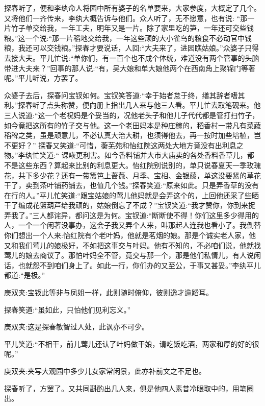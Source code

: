 \begin{parag}
    探春听了，便和李纨命人将园中所有婆子的名单要来，大家参度，大概定了几个。又将他们一齐传来，李纨大概告诉与他们。众人听了，无不愿意，也有说: “那一片竹子单交给我，一年工夫，明年又是一片。除了家里吃的笋，一年还可交些钱粮。”这一个说:“那一片稻地交给我，一年这些顽的大小雀鸟的粮食不必动官中钱粮，我还可以交钱粮。”探春才要说话，人回:“大夫来了，进园瞧姑娘。”众婆子只得去接大夫。平儿忙说:“单你们，有一百个也不成个体统，难道没有两个管事的头脑带进大夫来？”回事的那人说:“有，吴大娘和单大娘他两个在西南角上聚锦门等著呢。”平儿听说，方罢了。
\end{parag}


\begin{parag}
    众婆子去后，探春问宝钗如何。宝钗笑答道:“幸于始者怠于终，缮其辞者嗜其利。”探春听了点头称赞，便向册上指出几人来与他三人看。平儿忙去取笔砚来。他三人说道:“这一个老祝妈是个妥当的，况他老头子和他儿子代代都是管打扫竹子，如今竟把这所有的竹子交与他。这一个老田妈本是种庄稼的，稻香村一带凡有菜蔬稻稗之类，虽是顽意儿，不必认真大治大耕，也须得他去，再一按时加些培植，岂不更好？” 探春又笑道:“可惜，蘅芜苑和怡红院这两处大地方竟没有出利息之物。”李纨忙笑道:“ 课咴更利害。如今香料铺并大市大庙卖的各处香料香草儿，都不是这些东西？算起来比别的利息更大。怡红院别说别的，单只说春夏天一季玫瑰花，共下多少花？还有一带篱笆上蔷薇、月季、宝相、金银藤，单这没要紧的草花干了，卖到茶叶铺药铺去，也值几个钱。”探春笑道:“原来如此。只是弄香草的没有在行的人。”平儿忙笑道:“跟宝姑娘的莺儿他妈就是会弄这个的，上回他还采了些晒干了编成花篮葫芦给我顽的，姑娘倒忘了不成？”宝钗笑道:“我才赞你，你到来捉弄我了。”三人都诧异，都问这是为何。宝钗道:“断断使不得！你们这里多少得用的人，一个一个闲著没事办，这会子我又弄个人来，叫那起人连我也看小了。我倒替你们想出一个人来:怡红院有个老叶妈，他就是茗烟的娘。那是个诚实老人家，他又和我们莺儿的娘极好，不如把这事交与叶妈。他有不知的，不必咱们说，他就找莺儿的娘去商议了。那怕叶妈全不管，竟交与那一个，那是他们私情儿，有人说闲话，也就怨不到咱们身上了。如此一行，你们办的又至公，于事又甚妥。”李纨平儿都道:“是极。”\begin{note}庚双夹:宝钗此等非与凤姐一样，此则随时俯仰，彼则逸才逾蹈耳。\end{note}探春笑道:“虽如此，只怕他们见利忘义。”\begin{note}庚双夹:这是探春敏智过人处，此讽亦不可少。\end{note}平儿笑道:“不相干，前儿莺儿还认了叶妈做干娘，请吃饭吃酒，两家和厚的好的很呢。”\begin{note}庚双夹:夹写大观园中多少儿女家常闲景，此亦补前文之不足也。\end{note}探春听了，方罢了。又共同斟酌出几人来，俱是他四人素昔冷眼取中的，用笔圈出。
\end{parag}


